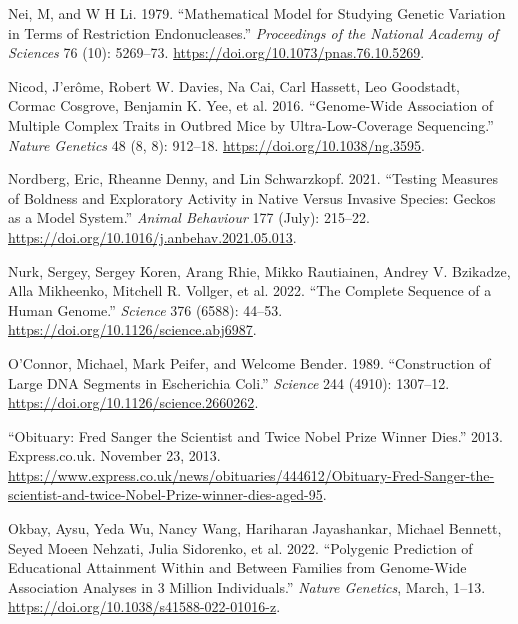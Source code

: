 \documentclass[
]{book}
\newlength{\cslhangindent}
\newlength{\cslentryspacingunit} %
\newenvironment{CSLReferences}[2] %
 {%
  \setlength{\parindent}{0pt}
  \ifodd #1
  \let\oldpar\par
  \def\par{\hangindent=\cslhangindent\oldpar}
  \fi
  \setlength{\parskip}{#2\cslentryspacingunit}
 }%
 {}
\begin{document}
\begin{CSLReferences}{1}{0}
\leavevmode{}%
Nei, M, and W H Li. 1979. {``Mathematical Model for Studying Genetic Variation in Terms of Restriction Endonucleases.''} \emph{Proceedings of the National Academy of Sciences} 76 (10): 5269--73. \url{https://doi.org/10.1073/pnas.76.10.5269}.

\leavevmode{}%
Nicod, J'erôme, Robert W. Davies, Na Cai, Carl Hassett, Leo Goodstadt, Cormac Cosgrove, Benjamin K. Yee, et al. 2016. {``Genome-Wide Association of Multiple Complex Traits in Outbred Mice by Ultra-Low-Coverage Sequencing.''} \emph{Nature Genetics} 48 (8, 8): 912--18. \url{https://doi.org/10.1038/ng.3595}.

\leavevmode{}%
Nordberg, Eric, Rheanne Denny, and Lin Schwarzkopf. 2021. {``Testing Measures of Boldness and Exploratory Activity in Native Versus Invasive Species: Geckos as a Model System.''} \emph{Animal Behaviour} 177 (July): 215--22. \url{https://doi.org/10.1016/j.anbehav.2021.05.013}.

\leavevmode{}%
Nurk, Sergey, Sergey Koren, Arang Rhie, Mikko Rautiainen, Andrey V. Bzikadze, Alla Mikheenko, Mitchell R. Vollger, et al. 2022. {``The Complete Sequence of a Human Genome.''} \emph{Science} 376 (6588): 44--53. \url{https://doi.org/10.1126/science.abj6987}.

\leavevmode{}%
O'Connor, Michael, Mark Peifer, and Welcome Bender. 1989. {``Construction of {Large DNA Segments} in {Escherichia} Coli.''} \emph{Science} 244 (4910): 1307--12. \url{https://doi.org/10.1126/science.2660262}.

\leavevmode{}%
{``Obituary: {Fred Sanger} the Scientist and Twice {Nobel Prize} Winner Dies.''} 2013. {Express.co.uk}. November 23, 2013. \url{https://www.express.co.uk/news/obituaries/444612/Obituary-Fred-Sanger-the-scientist-and-twice-Nobel-Prize-winner-dies-aged-95}.

\leavevmode{}%
Okbay, Aysu, Yeda Wu, Nancy Wang, Hariharan Jayashankar, Michael Bennett, Seyed Moeen Nehzati, Julia Sidorenko, et al. 2022. {``Polygenic Prediction of Educational Attainment Within and Between Families from Genome-Wide Association Analyses in 3 Million Individuals.''} \emph{Nature Genetics}, March, 1--13. \url{https://doi.org/10.1038/s41588-022-01016-z}.


\end{CSLReferences}
\end{document}
